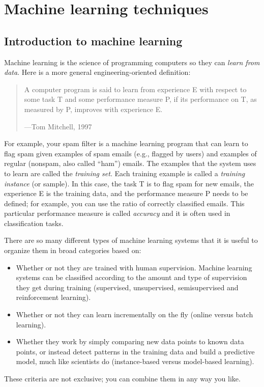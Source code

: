 \chapter{Machine learning techniques}\label{chap:4}
\section{Introduction to machine learning}\label{sec:Introduction_to_machine_learning}
Machine learning is the science of programming computers so they can \emph{learn from data}. Here is a more general engineering-oriented definition:
\begin{quote}
A computer program is said to learn from experience E with respect to some task T and some performance measure P, if its performance on T, as measured by P, improves with experience E.

{\raggedleft—Tom Mitchell, 1997\par}
\end{quote}
For example, your spam filter is a machine learning program that can learn to flag spam given examples of spam emails (e.g., flagged by users) and examples of regular (nonspam, also called ``ham'') emails. The examples that the system uses to learn are called the \emph{training set}. Each training example is called a \emph{training instance} (or sample). In this case, the task T is to flag spam for new emails, the experience E is the training data, and the performance measure P needs to be defined; for example, you can use the ratio of correctly classified emails. This particular performance measure is called \emph{accuracy} and it is often used in classification tasks.

There are so many different types of machine learning systems that it is useful to organize them in broad categories based on:
\begin{itemize}
\item Whether or not they are trained with human supervision. Machine learning systems can be classified according to the amount and type of supervision they get during training (supervised, unsupervised, semisupervised and reinforcement learning).
\item Whether or not they can learn incrementally on the fly (online versus batch learning).
\item Whether they work by simply comparing new data points to known data points, or instead detect patterns in the training data and build a predictive model, much like scientists do (instance-based versus model-based learning).
\end{itemize}
These criteria are not exclusive; you can combine them in any way you like.
